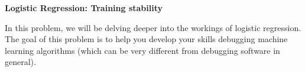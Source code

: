 \item {} {\bf Logistic Regression: Training stability}

In this problem, we will be delving deeper into the workings of logistic
regression. The goal of this problem is to help you develop your skills
debugging machine learning algorithms (which can be very different from
debugging software in general).

\begin{enumerate}

  

\ifnum{} {
  
} \fi

  

\ifnum{} {
  
} \fi

  

\ifnum{} {
  
} \fi

  

\ifnum{} {
  
} \fi

\end{enumerate}
